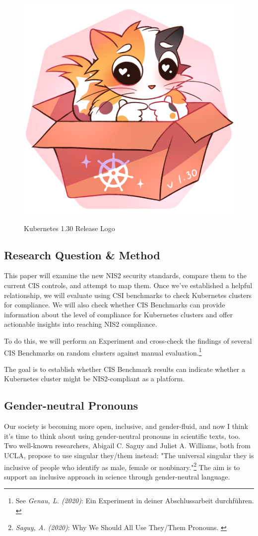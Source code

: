 \begin{figure}[H]
\centering
\caption {Kubernetes 1.30 Release Logo}
\includegraphics[width=0.3\linewidth]{images/k8s-1.30.png}
\label{fig:uwubernetes}
\end{figure}


\subsection{Research Question \& Method}

This paper will examine the new NIS2 security standards, compare them to the current CIS controls, and attempt to map them. Once we've established a helpful relationship, we will evaluate using CSI benchmarks to check Kubernetes clusters for compliance. We will also check whether CIS Benchmarks can provide information about the level of compliance for Kubernetes clusters and offer actionable insights into reaching NIS2 compliance.

To do this, we will perform an Experiment and cross-check the findings of several CIS Benchmarks on random clusters against manual evaluation.\footnote{See \textit{Genau, L. (2020)}: Ein Experiment in deiner Abschlussarbeit durchführen. \cite{expScribbr}}

The goal is to establish whether CIS Benchmark results can indicate whether a Kubernetes cluster might be NIS2-compliant as a platform.

\subsection{Gender-neutral Pronouns}

Our society is becoming more open, inclusive, and gender-fluid, and now I think it's time to think about using gender-neutral pronouns in scientific texts, too. Two well-known researchers, Abigail C. Saguy and Juliet A. Williams, both from UCLA, propose to use singular they/them instead: "The universal singular they is inclusive of people who identify as male, female or nonbinary."\footnote{\textit{Saguy, A. (2020)}: Why We Should All Use They/Them Pronouns. \cite{pronouns}} The aim is to support an inclusive approach in science through gender-neutral language. 


